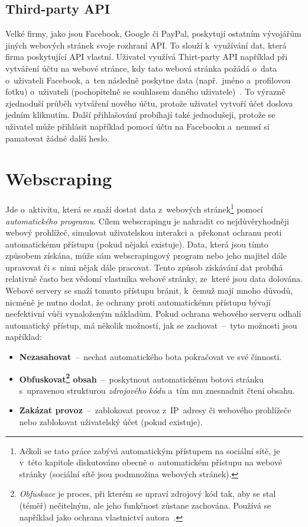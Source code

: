 \subsection*{Third-party API}
Velké firmy, jako jsou Facebook, Google či PayPal, poskytují ostatním vývojářům jiných webových stránek svoje rozhraní API. To slouží k~využívání dat, která firma poskytující API vlastní. Uživatel využívá Thirt-party API například při vytváření účtu na webové stránce, kdy tato webová stránka požádá o~data o~uživateli Facebook, a~ten následně poskytne data (např.~jméno a~profilovou fotku) o~uživateli (pochopitelně se souhlasem daného uživatele)~\cite{bib:third_party_API}. To výrazně zjednoduší průběh vytváření nového účtu, protože uživatel vytvoří účet doslova jedním kliknutím. Další přihlašování probíhají také jednodušeji, protože se uživatel může přihlásit například pomocí účtu na Facebooku a~nemusí si pamatovat žádné další heslo.

\section{Webscraping}
\label{sec:webscraping}
Jde o~aktivitu, která se snaží dostat data z~webových stránek\footnote{Ačkoli se tato práce zabývá automatickým přístupem na sociální sítě, je v~této kapitole diskutováno obecně o~automatickém přístupu na webové stránky (sociální sítě jsou podmnožina webových stránek).} pomocí \textit{automatického programu}. Cílem webscrapingu je nahradit co nejdůvěryhodněji webový prohlížeč, simulovat uživatelskou interakci a~překonat ochranu proti automatickému přístupu (pokud nějaká existuje). Data, která jsou tímto způsobem získána, může sám webscrapingový program nebo jeho majitel dále upravovat či s~nimi nějak dále pracovat. Tento způsob získávání dat probíhá relativně často bez vědomí vlastníka webové stránky, ze~které jsou data dolována. Webové servery se snaží tomuto přístupu bránit, k~čemuž mají mnoho důvodů, nicméně je nutno dodat, že ochrany proti automatickému přístupu bývají neefektivní vůči vynaloženým nákladům. Pokud ochrana webového serveru odhalí automatický přístup, má několik možností, jak se zachovat~--~tyto možnosti jsou například:

\begin{itemize}
  \item \textbf{Nezasahovat}~--~nechat automatického bota pokračovat ve své činnosti.
  \item \textbf{Obfuskovat\footnote{\textit{Obfuskace} je proces, při kterém se upraví zdrojový kód tak, aby se stal (téměř) nečitelným, ale jeho funkčnost zůstane zachována. Používá se například jako ochrana vlastnictví autora~\cite{bib:obfuskace}.} obsah}~--~poskytnout automatickému botovi stránku s~upravenou strukturou \textit{zdrojového kódu} a~tím mu znesnadnit čtení obsahu.
  \item \textbf{Zakázat provoz}~--~zablokovat provoz z~IP~adresy či webového prohlížeče nebo zablokovat uživatelský účet (pokud existuje).
\end{itemize}

